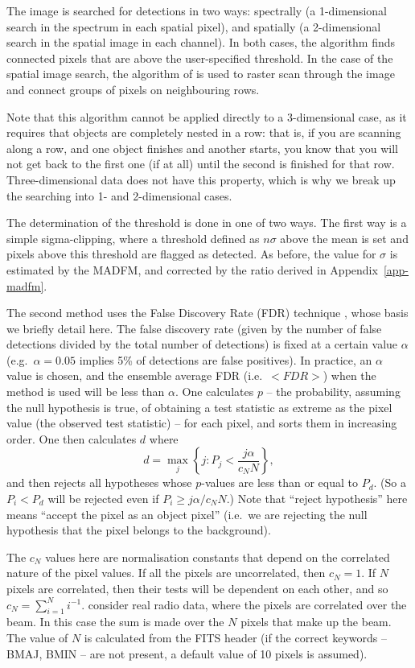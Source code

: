 \documentclass[12pt,a4paper]{article}
\newcommand{\eg}{e.g.\ }
\newcommand{\ie}{i.e.\ }
\begin{document}
The image is searched for detections in two ways: spectrally (a
1-dimensional search in the spectrum in each spatial pixel), and
spatially (a 2-dimensional search in the spatial image in each
channel). In both cases, the algorithm finds connected pixels that are
above the user-specified threshold. In the case of the spatial image
search, the algorithm of \citet{lutz80} is used to raster scan through
the image and connect groups of pixels on neighbouring rows.

Note that this algorithm cannot be applied directly to a 3-dimensional
case, as it requires that objects are completely nested in a row: that
is, if you are scanning along a row, and one object finishes and
another starts, you know that you will not get back to the first one
(if at all) until the second is finished for that
row. Three-dimensional data does not have this property, which is why
we break up the searching into 1- and 2-dimensional cases.

The determination of the threshold is done in one of two ways. The
first way is a simple sigma-clipping, where a threshold defined as
$n\sigma$ above the mean is set and pixels above this threshold are
flagged as detected. As before, the value for $\sigma$ is estimated by
the MADFM, and corrected by the ratio derived in
Appendix~\ref{app-madfm}. 

The second method uses the False Discovery Rate (FDR) technique
\citep{miller01,hopkins02}, whose basis we briefly detail here. The
false discovery rate (given by the number of false detections divided
by the total number of detections) is fixed at a certain value
$\alpha$ (\eg $\alpha=0.05$ implies 5\% of detections are false
positives). In practice, an $\alpha$ value is chosen, and the ensemble
average FDR (\ie $<FDR>$) when the method is used will be less than
$\alpha$.  One calculates $p$ -- the probability, assuming the null
hypothesis is true, of obtaining a test statistic as extreme as the
pixel value (the observed test statistic) -- for each pixel, and sorts
them in increasing order. One then calculates $d$ where
\[
d = \max_j \left\{ j : P_j < \frac{j\alpha}{c_N N} \right\},
\]
and then rejects all hypotheses whose $p$-values are less than or equal
to $P_d$. (So a $P_i<P_d$ will be rejected even if $P_i \geq
j\alpha/c_N N$.) Note that ``reject hypothesis'' here means ``accept
the pixel as an object pixel'' (\ie we are rejecting the null
hypothesis that the pixel belongs to the background). 

The $c_N$ values here are normalisation constants that depend on the
correlated nature of the pixel values. If all the pixels are
uncorrelated, then $c_N=1$. If $N$ pixels are correlated, then their
tests will be dependent on each other, and so $c_N = \sum_{i=1}^N
i^{-1}$. \citet{hopkins02} consider real radio data, where the pixels
are correlated over the beam. In this case the sum is made over the
$N$ pixels that make up the beam. The value of $N$ is calculated from
the FITS header (if the correct keywords -- BMAJ, BMIN -- are not
present, a default value of 10 pixels is assumed).
\end{document}
